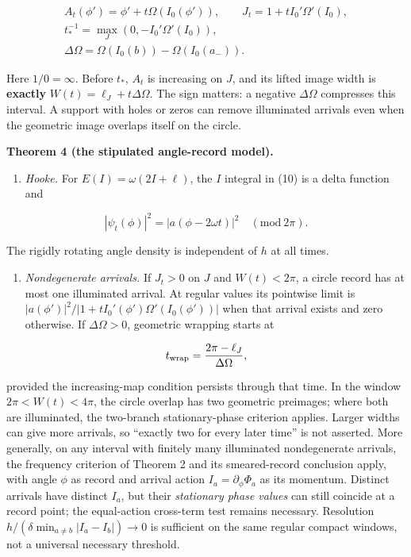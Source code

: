 \documentclass[11pt,a4paper]{article}
\newcommand{\tightlist}{\setlength{\itemsep}{0pt}\setlength{\parskip}{0pt}}
\begin{document}
\[\begin{gathered}
 A_t(\phi')=\phi'+t\Omega(I_0(\phi')),\qquad
 J_t=1+tI_0'\Omega'(I_0),\\
 t_*^{-1}=\max_J(0,-I_0'\Omega'(I_0)),\\
 \Delta\Omega=\Omega(I_0(b))-\Omega(I_0(a_-)).
\end{gathered}\tag{11}\]

Here \(1/0=\infty\). Before \(t_*\), \(A_t\) is increasing on \(J\), and
its lifted image width is \textbf{exactly}
\(W(t)=\ell_J+t\Delta\Omega\). The sign matters: a negative
\(\Delta\Omega\) compresses this interval. A support with holes or zeros
can remove illuminated arrivals even when the geometric image overlaps
itself on the circle.

\textbf{Theorem 4 (the stipulated angle-record model).}

\begin{enumerate}
\def\labelenumi{(\alph{enumi})}
\tightlist
\item
  \emph{Hooke.} For \(E(I)=\omega(2I+\ell)\), the \(I\) integral in (10)
  is a delta function and
\end{enumerate}

\[|\psi_t(\phi)|^2=|a(\phi-2\omega t)|^2\quad(\mathrm{mod}\ 2\pi).\tag{12}\]

The rigidly rotating angle density is independent of \(h\) at all times.

\begin{enumerate}
\def\labelenumi{(\alph{enumi})}
\setcounter{enumi}{1}
\tightlist
\item
  \emph{Nondegenerate arrivals.} If \(J_t>0\) on \(J\) and
  \(W(t)<2\pi\), a circle record has at most one illuminated arrival. At
  regular values its pointwise limit is
  \(|a(\phi')|^2/|1+tI_0'(\phi')\Omega'(I_0(\phi'))|\) when that arrival
  exists and zero otherwise. If \(\Delta\Omega>0\), geometric wrapping
  starts at
\end{enumerate}

\[t_{\rm wrap}=\frac{2\pi-\ell_J}{\Delta\Omega},\]

provided the increasing-map condition persists through that time. In the
window \(2\pi<W(t)<4\pi\), the circle overlap has two geometric
preimages; where both are illuminated, the two-branch stationary-phase
criterion applies. Larger widths can give more arrivals, so ``exactly
two for every later time'' is not asserted. More generally, on any
interval with finitely many illuminated nondegenerate arrivals, the
frequency criterion of Theorem 2 and its smeared-record conclusion
apply, with angle \(\phi\) as record and arrival action
\(I_a=\partial_\phi\Phi_a\) as its momentum. Distinct arrivals have
distinct \(I_a\), but their \emph{stationary phase values} can still
coincide at a record point; the equal-action cross-term test remains
necessary. Resolution \(h/(\delta\min_{a\ne b}|I_a-I_b|)\to0\) is
sufficient on the same regular compact windows, not a universal
necessary threshold.
\end{document}
